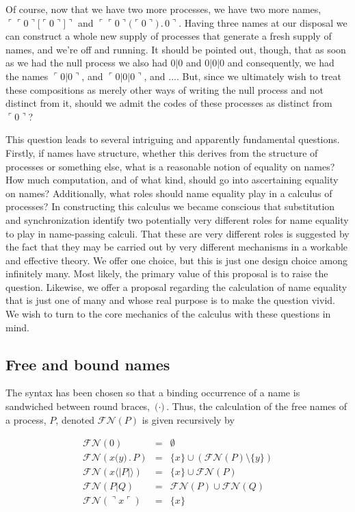 \documentclass[]{amsart}
\newcommand{\lliftb}{\langle\!|}
\newcommand{\rliftb}{|\!\rangle}
\newcommand{\lpquote}{\ulcorner}
\newcommand{\rpquote}{\urcorner}
\newcommand{\id}[1]{\texttt{#1}}
\newcommand{\pzero}{\mathbin{0}}
\newcommand{\juxtap}{\mathbin{\id{|}}}
\newcommand{\concat}{\mathbin{.}}
\newcommand{\freenames}[1]{\mathbin{\mathcal{FN}(#1)}}
\newcommand{\binpar}[2]{#1 \juxtap #2}
\newcommand{\lift}[2]{#1 \lliftb #2 \rliftb}
\newcommand{\quotep}[1]{\lpquote #1 \rpquote}
\newcommand{\dropn}[1]{\rpquote #1 \lpquote}
\theoremstyle{definition}
\theoremstyle{remark}
\numberwithin{equation}{subsection}
\begin{document}
Of course, now that we have two more processes, we have two more
names, $\quotep{\quotep{0}\id{[}{\quotep{0}}\id{]}}$ and
$\quotep{\quotep{0}\id{(}{\quotep{0}}\id{)} \concat 0}$. Having three
names at our disposal we can construct a whole new supply of processes
that generate a fresh supply of names, and we're off and running. It
should be pointed out, though, that as soon as we had the null process
we also had $0 \juxtap 0$ and $0 \juxtap 0 \juxtap 0$ and
consequently, we had the names $\quotep{ 0 \juxtap 0 }$, and $\quotep{
0 \juxtap 0 \juxtap 0}$, and .... But, since we ultimately wish to
treat these compositions as merely other ways of writing the null
process and not distinct from it, should we admit the codes of these
processes as distinct from $\quotep{0}$?

This question leads to several intriguing and apparently fundamental
questions. Firstly, if names have structure, whether this derives from
the structure of processes or something else, what is a reasonable
notion of equality on names? How much computation, and of what kind,
should go into ascertaining equality on names? Additionally, what
roles should name equality play in a calculus of processes? In
constructing this calculus we became conscious that substitution and
synchronization identify two potentially very different roles for name
equality to play in name-passing calculi. That these are very
different roles is suggested by the fact that they may be carried out
by very different mechanisms in a workable and effective theory. We
offer one choice, but this is just one design choice among infinitely
many. Most likely, the primary value of this proposal is to raise the
question. Likewise, we offer a proposal regarding the calculation of
name equality that is just one of many and whose real purpose is to
make the question vivid. We wish to turn to the core mechanics of the
calculus with these questions in mind.

\subsection{Free and bound names}

The syntax has been chosen so that a binding occurrence of a name is
sandwiched between round braces, $\id{(} \cdot \id{)}$. Thus, the
calculation of the free names of a process, $P$, denoted
$\freenames{P}$ is given recursively by

	\begin{eqnarray*}
		\freenames{\pzero} & = & \emptyset \\
		\freenames{x \id{(}y\id{)} \concat P} & = & \{ x \} \cup (\freenames{P} \setminus \{ y \}) \\
		\freenames{\lift{x}{P}} & = & \{ x \} \cup \freenames{P} \\
		\freenames{\binpar{P}{Q}} & = & \freenames{P} \cup \freenames{Q} \\
		\freenames{\dropn{x}} & = & \{ x \} \\
	\end{eqnarray*}
\end{document}
